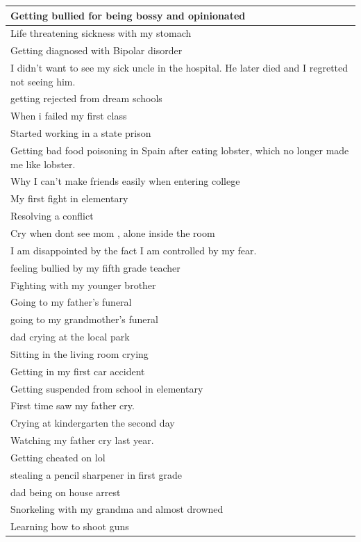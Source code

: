 \documentclass[
  .7em,
  letterpaper,
  DIV=11,
  numbers=noendperiod]{scrartcl}
\begin{document}
\begin{table}
\begin{tabular}{l}
\hline
Getting bullied for being bossy and opinionated\\
\hline
Life threatening sickness with my stomach\\
\hline
Getting diagnosed with Bipolar disorder\\
\hline
I didn't want to see my sick uncle in the hospital. He later died and I regretted not seeing him.\\
\hline
getting rejected from dream schools\\
\hline
When i failed my first class\\
\hline
Started working in a state prison\\
\hline
Getting bad food poisoning in Spain after eating lobster, which no longer made me like lobster.\\
\hline
Why I can't make friends easily when entering college\\
\hline
My first fight in elementary\\
\hline
Resolving a conflict\\
\hline
Cry when dont see mom , alone inside the room\\
\hline
I am disappointed by the fact I am controlled by my fear.\\
\hline
feeling bullied by my fifth grade teacher\\
\hline
Fighting with my younger brother\\
\hline
Going to my father's funeral\\
\hline
going to my grandmother’s funeral\\
\hline
dad crying at the local park\\
\hline
Sitting in the living room crying\\
\hline
Getting in my first car accident\\
\hline
Getting suspended from school in elementary\\
\hline
First time saw my father cry.\\
\hline
Crying at kindergarten the second day\\
\hline
Watching my father cry last year.\\
\hline
Getting cheated on lol\\
\hline
stealing a pencil sharpener in first grade\\
\hline
dad being on house arrest\\
\hline
Snorkeling with my grandma and almost drowned\\
\hline
Learning how to shoot guns\\
\hline

\end{tabular}
\end{table}
\end{document}
